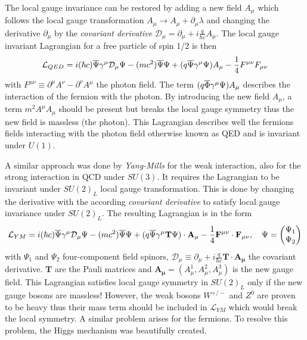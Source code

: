 The local gauge invariance can be restored by adding a new field $A_{\mu}$ which follows the local gauge transformation $A_{\mu} \rightarrow A_{\mu} + \partial_{\mu}\lambda$ and changing the derivative $\partial_{\mu}$ by the \textit{covariant derivative} $\mathcal{D}_{\mu} = \partial_{\mu} + i\frac{q}{\hbar c}A_{\mu}$. The local gauge invariant Lagrangian for a free particle of spin 1/2 is then \cite{Griffiths:343277}
\begin{equation}
  \mathcal{L}_{QED} = i(\hbar c)\overline{\rm \Psi}\gamma^{\mu}\mathcal{D}_{\mu}\Psi - (mc^2)\overline{\rm \Psi}\Psi + (q\overline{\rm \Psi}\gamma^{\mu}\Psi)A_{\mu} - \frac{1}{4}F^{\mu\nu}F_{\mu\nu}
\end{equation}
with $F^{\mu\nu} \equiv \partial^{\mu}A^{\nu} - \partial^{\nu}A^{\mu}$ the photon field. The term $(q\overline{\rm \Phi}\gamma^{\mu}\Psi)A_{\mu}$ describes the interaction of the fermion with the photon. By introducing the new field $A_{\mu}$, a term $m^2A^{\mu}A_{\mu}$ should be present but breaks the local gauge symmetry thus the new field is massless (the photon). This Lagrangian describes well the fermions fields interacting with the photon field otherwise known as QED and is invariant under $U(1)$.

A similar approach was done by \textit{Yang-Mills} for the weak interaction, also for the strong interaction in QCD under $SU(3)$. It requires the Lagrangian to be invariant under $SU(2)_{L}$ local gauge transformation. This is done by changing the derivative with the according \textit{covariant derivative} to satisfy local gauge invariance under $SU(2)_{L}$. The resulting Lagrangian is in the form \cite{Griffiths:343277}
\begin{equation}
  \mathcal{L}_{YM} = i(\hbar c)\overline{\rm \Psi}\gamma^{\mu}\mathcal{D}_{\mu}\Psi - (mc^2)\overline{\rm \Psi}\Psi + (q\overline{\rm \Psi}\gamma^{\mu}\mathbf{T}\Psi) \cdot \mathbf{A_{\mu}} - \frac{1}{4}\mathbf{F^{\mu\nu}} \cdot \mathbf{F_{\mu\nu}}, \quad \Psi = \begin{pmatrix} \Psi_1 \\ \Psi_2 \end{pmatrix}
\end{equation}
with $\Psi_1$ and $\Psi_2$ four-component field spinors, $\mathcal{D}_{\mu} \equiv \partial_{\mu} + i\frac{q}{\hbar c}\mathbf{T} \cdot \mathbf{A_{\mu}}$ the covariant derivative. $\mathbf{T}$ are the Pauli matrices and $\mathbf{A_{\mu}} = (A_{\mu}^1, A_{\mu}^2, A_{\mu}^3)$ is the new gauge field. This Lagrangian satisfies local gauge symmetry in $SU(2)_{L}$ only if the new gauge bosons are massless! However, the weak bosons $W^{+/-}$ and $Z^0$ are proven to be heavy thus their mass term should be included in $\mathcal{L}_{YM}$ which would break the local symmetry. A similar problem arises for the fermions. To resolve this problem, the Higgs mechanism was beautifully created.

